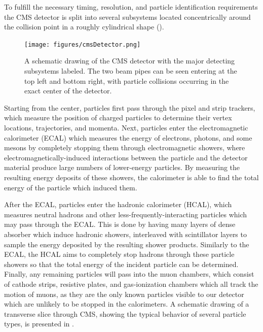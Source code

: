 To fulfill the necessary timing, resolution, and particle identification requirements the CMS detector is split into several subsystems located concentrically around the collision point in a roughly cylindrical shape (). 

\begin{figure}[htpb]
    \texttt{[image: figures/cmsDetector.png]}
    \centering
	\caption[The CMS Detector]{A schematic drawing of the CMS detector with the major detecting subsystems labeled. The two beam pipes can be seen entering at the top left and bottom right, with particle collisions occurring in the exact center of the detector.}
    \label{fig:detector}
\end{figure}

Starting from the center, particles first pass through the pixel and strip trackers, which measure the position of charged particles to determine their vertex locations, trajectories, and momenta.
Next, particles enter the electromagnetic calorimeter (ECAL) which measures the energy of electrons, photons, and some mesons by completely stopping them through electromagnetic showers, where electromagnetically-induced interactions between the particle and the detector material produce large numbers of lower-energy particles.
By measuring the resulting energy deposits of these showers, the calorimeter is able to find the total energy of the particle which induced them.

After the ECAL, particles enter the hadronic calorimeter (HCAL), which measures neutral hadrons and other less-frequently-interacting particles which may pass through the ECAL. This is done by having many layers of dense absorber which induce hadronic showers, interleaved with scintillator layers to sample the energy deposited by the resulting shower products.
Similarly to the ECAL, the HCAL aims to completely stop hadrons through these particle showers so that the total energy of the incident particle can be determined.
Finally, any remaining particles will pass into the muon chambers, which consist of cathode strips, resistive plates, and gas-ionization chambers which all track the motion of muons, as they are the only known particles visible to our detector which are unlikely to be stopped in the calorimeters.
A schematic drawing of a transverse slice through CMS, showing the typical behavior of several particle types, is presented in .

